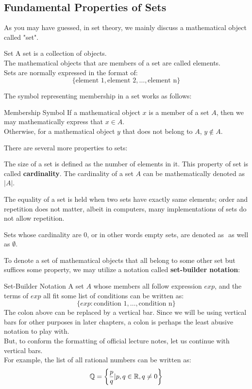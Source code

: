 \subsection{Fundamental Properties of Sets}
As you may have guessed, in set theory, we mainly discuss a mathematical object called "set".
\begin{ln-define}{Set}{}
    A set is a collection of objects. \\
    The mathematical objects that are members of a set are called elements. \\
    Sets are normally expressed in the format of:
    \[\{\text{element 1}, \text{element 2}, \dots, \text{element n}\}\]
\end{ln-define}
The symbol representing membership in a set works as follows:
\begin{ln-symbol}{Membership Symbol}{}
    If a mathematical object $x$ is a member of a set $A$, then we may mathematically express that $x \in A$. \\
    Otherwise, for a mathematical object $y$ that does not belong to $A$, $y \notin A$.
\end{ln-symbol}
There are several more properties to sets:
\begin{bindenum}
    \item The size of a set is defined as the number of elements in it. This property of set is called \textbf{cardinality}. The cardinality of a set $A$ can be mathematically denoted as $|A|$.
    \item The equality of a set is held when two sets have exactly same elements; order and repetition does not matter, albeit in computers, many implementations of sets do not allow repetition. 
    \item Sets whose cardinality are 0, or in other words empty sets, are denoted as ${}$ as well as $\emptyset$. \\
\end{bindenum}
To denote a set of mathematical objects that all belong to some other set but suffices some property, we may utilize a notation called \textbf{set-builder notation}:
\begin{ln-symbol}{Set-Builder Notation}{}
    A set $A$ whose members all follow expression $exp$, and the terms of $exp$ all fit some list of conditions can be written as:
    \[\{exp : \text{condition 1}, \dots, \text{condition n}\}\]
    \tcblower
    The colon above can be replaced by a vertical bar. Since we will be using vertical bars for other purposes in later chapters, a colon is perhaps the least abusive notation to play with. \\
    But, to conform the formatting of official lecture notes, let us continue with vertical bars. \\
    For example, the list of all rational numbers can be written as:
    \[\mathbb{Q} = \bigg\{ \frac{p}{q} | p,q \in \mathbb{R}, q \neq 0 \bigg\}\]
\end{ln-symbol}

